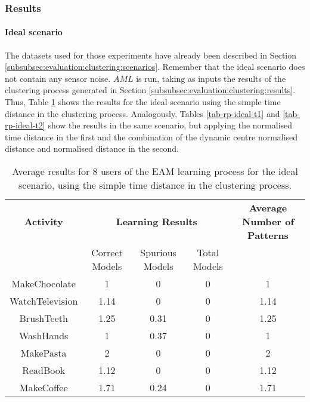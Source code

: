 \subsubsection{Results}
\label{subsubsec:evaluation:eam:results}

\paragraph*{Ideal scenario}

The datasets used for those experiments have already been described in Section \ref{subsubsec:evaluation:clustering:scenarios}. Remember that the ideal scenario does not contain any sensor noise. $AML$ is run, taking as inputs the results of the clustering process generated in Section \ref{subsubsec:evaluation:clustering:results}. Thus, Table \ref{tab-rp-ideal-t0} shows the results for the ideal scenario using the simple time distance in the clustering process. Analogously, Tables \ref{tab-rp-ideal-t1} and \ref{tab-rp-ideal-t2} show the results in the same scenario, but applying the normalised time distance in the first and the combination of the dynamic centre normalised distance and normalised distance in the second. 


\begin{table}[htbp]\scriptsize
  \begin{center}
        \begin{tabular}{ccccc}
            \hline            
            \textbf{Activity} & \multicolumn{3}{c}{\textbf{Learning Results}} & \textbf{Average Number of Patterns} \\
             & Correct Models & Spurious Models & Total Models & \\
            \hline
            MakeChocolate   & 1    & 0     & 0  & 1 \\
	    WatchTelevision & 1.14 & 0     & 0  & 1.14    \\
	    BrushTeeth      & 1.25 & 0.31  & 0  & 1.25 \\
	    WashHands       & 1    & 0.37  & 0  & 1 \\
	    MakePasta       & 2    & 0     & 0  & 2 \\
	    ReadBook        & 1.12 & 0     & 0  & 1.12  \\
	    MakeCoffee      & 1.71 & 0.24  & 0  & 1.71  \\
            \hline
        \end{tabular}
        \caption{Average results for 8 users of the EAM learning process for the ideal scenario, using the simple time distance in the clustering process.}
        \label{tab-rp-ideal-t0}
    \end{center}
\end{table}


